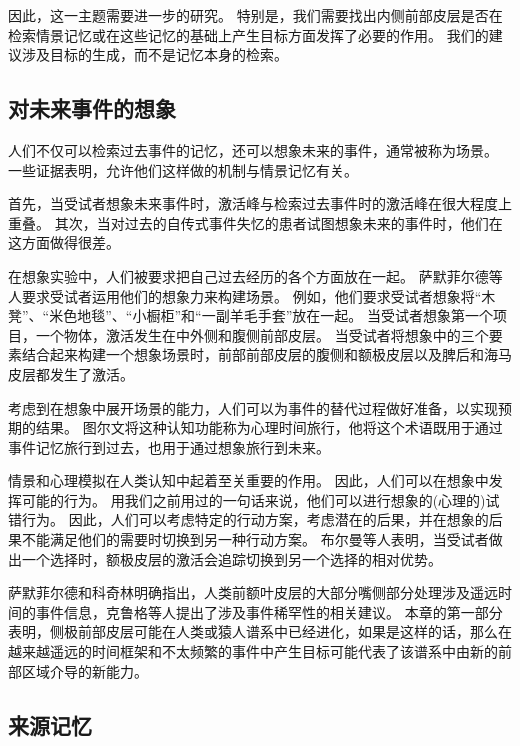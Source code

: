因此，这一主题需要进一步的研究。
特别是，我们需要找出内侧前部皮层是否在检索情景记忆或在这些记忆的基础上产生目标方面发挥了必要的作用。
我们的建议涉及目标的生成，而不是记忆本身的检索。
\par



\subsection{对未来事件的想象}
\par
人们不仅可以检索过去事件的记忆，还可以想象未来的事件，通常被称为场景。
一些证据表明，允许他们这样做的机制与情景记忆有关\cite{addis2007remembering}。


首先，当受试者想象未来事件时，激活峰与检索过去事件时的激活峰在很大程度上重叠\cite{hassabis2007using}。
其次，当对过去的自传式事件失忆的患者试图想象未来的事件时，他们在这方面做得很差\cite{hassabis2007patients}。


在想象实验中，人们被要求把自己过去经历的各个方面放在一起\cite{schacter2007remembering}。
萨默菲尔德等人\cite{summerfield2010differential}要求受试者运用他们的想象力来构建场景。
例如，他们要求受试者想象将“木凳”、“米色地毯”、“小橱柜”和“一副羊毛手套”放在一起。
当受试者想象第一个项目，一个物体，激活发生在中外侧和腹侧前部皮层。
当受试者将想象中的三个要素结合起来构建一个想象场景时，前部前部皮层的腹侧和额极皮层以及脾后和海马皮层都发生了激活。


考虑到在想象中展开场景的能力，人们可以为事件的替代过程做好准备，以实现预期的结果。
图尔文\cite{tulving2005episodic}将这种认知功能称为心理时间旅行，他将这个术语既用于通过事件记忆旅行到过去，也用于通过想象旅行到未来。


情景和心理模拟在人类认知中起着至关重要的作用。
因此，人们可以在想象中发挥可能的行为。
用我们之前用过的一句话来说，他们可以进行想象的(心理的)试错行为。
因此，人们可以考虑特定的行动方案，考虑潜在的后果，并在想象的后果不能满足他们的需要时切换到另一种行动方案。
布尔曼等人\cite{boorman2009green}表明，当受试者做出一个选择时，额极皮层的激活会追踪切换到另一个选择的相对优势。


萨默菲尔德和科奇林\cite{summerfield2009decision}明确指出，人类前额叶皮层的大部分嘴侧部分处理涉及遥远时间的事件信息，克鲁格等人\cite{krueger2007event}提出了涉及事件稀罕性的相关建议。
本章的第一部分表明，侧极前部皮层可能在人类或猿人谱系中已经进化，如果是这样的话，那么在越来越遥远的时间框架和不太频繁的事件中产生目标可能代表了该谱系中由新的前部区域介导的新能力。



\subsection{来源记忆}

